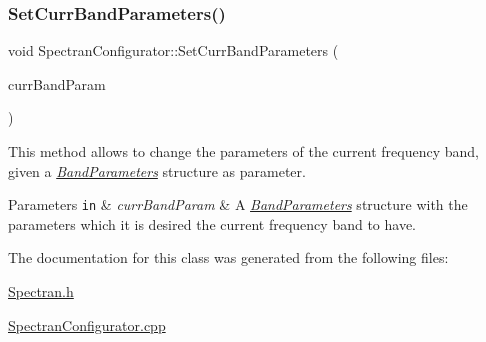 \subsubsection{\texorpdfstring{Set\+Curr\+Band\+Parameters()}{SetCurrBandParameters()}}
{\footnotesize\ttfamily void Spectran\+Configurator\+::\+Set\+Curr\+Band\+Parameters (\begin{DoxyParamCaption}\item[{const \hyperlink{structBandParameters}{Band\+Parameters} \&}]{curr\+Band\+Param }\end{DoxyParamCaption})\hspace{0.3cm}{\ttfamily [inline]}}



This method allows to change the parameters of the current frequency band, given a {\itshape \hyperlink{structBandParameters}{Band\+Parameters}} structure as parameter. 


\begin{DoxyParams}[1]{Parameters}
\mbox{\tt in}  & {\em curr\+Band\+Param} & A {\itshape \hyperlink{structBandParameters}{Band\+Parameters}} structure with the parameters which it is desired the current frequency band to have. \\
\hline
\end{DoxyParams}


The documentation for this class was generated from the following files\+:\begin{DoxyCompactItemize}
\item 
\hyperlink{Spectran_8h}{Spectran.\+h}\item 
\hyperlink{SpectranConfigurator_8cpp}{Spectran\+Configurator.\+cpp}\end{DoxyCompactItemize}

